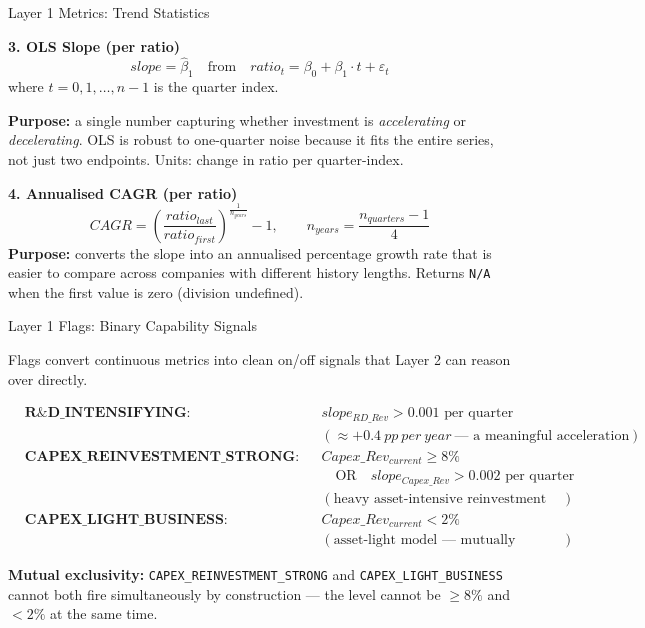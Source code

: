 \documentclass[aspectratio=169]{beamer}
\begin{document}
\begin{frame}{Layer 1 Metrics: Trend Statistics}
\small

\textbf{3. OLS Slope (per ratio)}
\[
slope = \hat{\beta}_1 \quad \text{from} \quad ratio_t = \beta_0 + \beta_1 \cdot t + \varepsilon_t
\]
where $t = 0, 1, \ldots, n{-}1$ is the quarter index.

\vspace{0.2cm}
\textbf{Purpose:} a single number capturing whether investment is
\emph{accelerating} or \emph{decelerating}. OLS is robust to one-quarter
noise because it fits the entire series, not just two endpoints.
Units: change in ratio per quarter-index.

\vspace{0.5cm}
\textbf{4. Annualised CAGR (per ratio)}
\[
CAGR = \left(\frac{ratio_{last}}{ratio_{first}}\right)^{\!\frac{1}{n_{years}}} - 1,
\qquad n_{years} = \frac{n_{quarters} - 1}{4}
\]
\textbf{Purpose:} converts the slope into an annualised percentage growth rate
that is easier to compare across companies with different history lengths.
Returns \texttt{N/A} when the first value is zero (division undefined).

\end{frame}

\begin{frame}{Layer 1 Flags: Binary Capability Signals}
\small

Flags convert continuous metrics into clean on/off signals that Layer 2 can
reason over directly.

\vspace{0.3cm}
\begin{align*}
&\textbf{R\&D\_INTENSIFYING:} &&
slope_{RD\_Rev} > 0.001 \text{ per quarter} \\
&&& (\approx +0.4\ pp\ per\ year\ \text{--- a meaningful acceleration}) \\[6pt]
&\textbf{CAPEX\_REINVESTMENT\_STRONG:} &&
Capex\_Rev_{current} \geq 8\% \\
&&& \quad \text{OR} \quad slope_{Capex\_Rev} > 0.002 \text{ per quarter} \\[2pt]
&&& (\text{heavy asset-intensive reinvestment OR rapid ramp}) \\[6pt]
&\textbf{CAPEX\_LIGHT\_BUSINESS:} &&
Capex\_Rev_{current} < 2\% \\
&&& (\text{asset-light model --- mutually exclusive with STRONG})
\end{align*}

\vspace{0.3cm}
\textbf{Mutual exclusivity:} \texttt{CAPEX\_REINVESTMENT\_STRONG} and
\texttt{CAPEX\_LIGHT\_BUSINESS} cannot both fire simultaneously by construction
--- the level cannot be $\geq 8\%$ and $< 2\%$ at the same time.

\end{frame}
\end{document}
